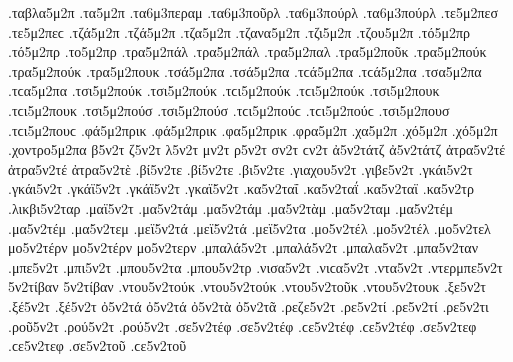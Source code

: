 {.ταβλα5μ2π   %
.τα5μ2π   %
.τα6μ3περαμ   %
.τα6μ3ποῦρλ   %
.τα6μ3πούρλ .τα6μ3πούρλ 
.τε5μ2πεσ .τε5μ2πεϲ   %
.τζά5μ2π .τζά5μ2π   %
.τζα5μ2π 
.τζανα5μ2π   %
.τζι5μ2π   %
.τζου5μ2π   %
.τό5μ2πρ .τό5μ2πρ   %
.το5μ2πρ 
.τρα5μ2πάλ .τρα5μ2πάλ   %
.τρα5μ2παλ 
.τρα5μ2ποῦκ   %
.τρα5μ2πούκ .τρα5μ2πούκ 
.τρα5μ2πουκ 
.τσά5μ2πα .τσά5μ2πα .τϲά5μ2πα .τϲά5μ2πα   %
.τσα5μ2πα .τϲα5μ2πα 
.τσι5μ2πούκ .τσι5μ2πούκ .τϲι5μ2πούκ .τϲι5μ2πούκ   %
.τσι5μ2πουκ .τϲι5μ2πουκ 
.τσι5μ2πούσ .τσι5μ2πούσ .τϲι5μ2πούϲ .τϲι5μ2πούϲ   %
.τσι5μ2πουσ .τϲι5μ2πουϲ 
.φά5μ2πρικ .φά5μ2πρικ   %
.φα5μ2πρικ 
.φρα5μ2π   %
.χα5μ2π   %
.χό5μ2π .χό5μ2π   %
.χοντρο5μ2πα   %
β5ν2τ 
ζ5ν2τ 
λ5ν2τ 
μν2τ 
ρ5ν2τ 
σν2τ ϲν2τ 
ἀ5ν2τάτζ ἀ5ν2τάτζ   %
ἀτρα5ν2τέ ἀτρα5ν2τέ   %
ἀτρα5ν2τὲ 
.βί5ν2τε .βί5ν2τε   %
.βι5ν2τε 
.γιαχου5ν2τ   %
.γιβε5ν2τ   %
.γκάι5ν2τ .γκάι5ν2τ   %
.γκάϊ5ν2τ .γκάϊ5ν2τ 
.γκαϊ5ν2τ 
.κα5ν2ταΐ .κα5ν2ταΐ   %
.κα5ν2ταϊ 
.κα5ν2τρ   %
.λικβι5ν2ταρ   %
.μαϊ5ν2τ   %
.μα5ν2τάμ .μα5ν2τάμ   %
.μα5ν2τὰμ 
.μα5ν2ταμ 
.μα5ν2τέμ .μα5ν2τέμ   %
.μα5ν2τεμ 
.μεϊ5ν2τά .μεϊ5ν2τά   %
.μεϊ5ν2τα 
.μο5ν2τέλ .μο5ν2τέλ   %
.μο5ν2τελ 
μο5ν2τέρν μο5ν2τέρν   %
μο5ν2τερν 
.μπαλά5ν2τ .μπαλά5ν2τ   %
.μπαλα5ν2τ 
.μπα5ν2ταν   %
.μπε5ν2τ   %
.μπι5ν2τ   %
.μπου5ν2τα   %
.μπου5ν2τρ   %
.νισα5ν2τ .νιϲα5ν2τ   %
.ντα5ν2τ   %
.ντερμπε5ν2τ   %
5ν2τίβαν 5ν2τίβαν   %
.ντου5ν2τούκ .ντου5ν2τούκ   %
.ντου5ν2τοῦκ 
.ντου5ν2τουκ 
.ξε5ν2τ   %
.ξέ5ν2τ .ξέ5ν2τ 
ὀ5ν2τά ὀ5ν2τά   %
ὀ5ν2τὰ 
ὀ5ν2τᾶ 
.ρεζε5ν2τ   %
.ρε5ν2τί .ρε5ν2τί   %
.ρε5ν2τι 
.ροῦ5ν2τ   %
.ρού5ν2τ .ρού5ν2τ 
.σε5ν2τέφ .σε5ν2τέφ .ϲε5ν2τέφ .ϲε5ν2τέφ   %
.σε5ν2τεφ .ϲε5ν2τεφ 
.σε5ν2τοῦ .ϲε5ν2τοῦ   %
}
